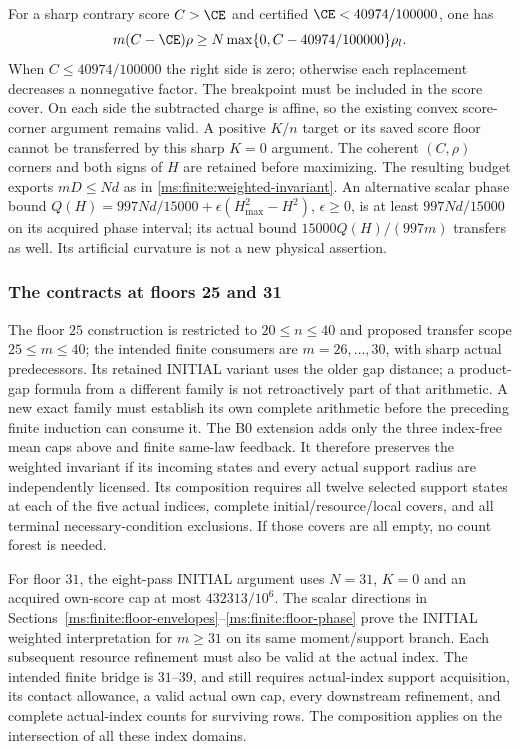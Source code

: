 For a sharp contrary score $C>\CE$ and certified
$\CE<40974/100000$, one has
\[
 m(C-\CE)\rho\ge N\max\{0,C-40974/100000\}\rho_l.
\]
When $C\le40974/100000$ the right side is zero; otherwise each
replacement decreases a nonnegative factor. The breakpoint must be
included in the score cover. On each side the subtracted charge is affine,
so the existing convex score-corner argument remains valid. A positive
$K/n$ target or its saved score floor cannot be transferred by this sharp
$K=0$ argument. The coherent $(C,\rho)$ corners and both signs of $H$
are retained before maximizing. The resulting budget exports
$mD\le Nd$ as in \eqref{ms:finite:weighted-invariant}.
An alternative scalar phase bound
$Q(H)=997Nd/15000+\epsilon(H_{\max}^2-H^2)$, $\epsilon\ge0$,
is at least $997Nd/15000$ on its acquired phase interval; its actual
bound $15000Q(H)/(997m)$ transfers as well. Its artificial curvature
is not a new physical assertion.

\subsubsection{The contracts at floors 25 and 31}
\label{ms:finite:floor25-31}
The floor $25$ construction is restricted to
$20\le n\le40$ and proposed transfer scope $25\le m\le40$;
the intended finite consumers are $m=26,\ldots,30$, with sharp actual
predecessors. Its retained INITIAL variant uses the older gap distance;
a product-gap formula from a different family is not retroactively part of
that arithmetic. A new exact family must establish its own complete arithmetic
before the preceding finite induction can consume it.
The B0 extension adds only the three index-free mean caps above and finite
same-law feedback. It therefore preserves the weighted invariant if its
incoming states and every actual support radius are independently licensed.
Its composition requires all twelve selected support states at each
of the five actual indices, complete initial/resource/local covers, and all
terminal necessary-condition exclusions. If those covers are all empty,
no count forest is needed.

For floor $31$, the eight-pass INITIAL argument uses $N=31$, $K=0$ and
an acquired own-score cap at most $432313/10^6$. The scalar directions in
Sections~\ref{ms:finite:floor-envelopes}--\ref{ms:finite:floor-phase}
prove the INITIAL weighted interpretation for $m\ge31$ on its same
moment/support branch. Each subsequent resource refinement must also
be valid at the actual index.
The intended finite bridge is $31$--$39$, and still requires actual-index
support acquisition, its contact allowance, a valid actual own cap, every
downstream refinement, and complete actual-index counts for surviving rows.
The composition applies on the intersection of all these index domains.

